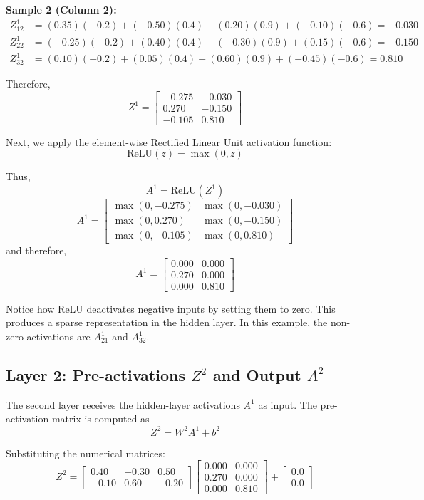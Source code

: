 \documentclass[11pt]{article}
\begin{document}
\textbf{Sample 2 (Column 2):}
\begin{align*}
Z^1_{12} &= (0.35)(-0.2) + (-0.50)(0.4) + (0.20)(0.9) + (-0.10)(-0.6) = -0.030 \\
Z^1_{22} &= (-0.25)(-0.2) + (0.40)(0.4) + (-0.30)(0.9) + (0.15)(-0.6) = -0.150 \\
Z^1_{32} &= (0.10)(-0.2) + (0.05)(0.4) + (0.60)(0.9) + (-0.45)(-0.6) = 0.810
\end{align*}

Therefore,
\[
Z^1 =
\begin{bmatrix}
-0.275 & -0.030 \\
0.270 & -0.150 \\
-0.105 & 0.810
\end{bmatrix}
\]

Next, we apply the element-wise Rectified Linear Unit activation function:
\[
\text{ReLU}(z) = \max(0, z)
\]

Thus,
\[
A^1 = \text{ReLU}(Z^1)
\]
\[
A^1 = \begin{bmatrix} \max(0, -0.275) & \max(0, -0.030) \\ \max(0, 0.270) & \max(0, -0.150) \\ \max(0, -0.105) & \max(0, 0.810) \end{bmatrix}
\]
and therefore,
\[
A^1 =
\begin{bmatrix}
0.000 & 0.000 \\
0.270 & 0.000 \\
0.000 & 0.810
\end{bmatrix}
\]

Notice how ReLU deactivates negative inputs by setting them to zero. This produces a sparse representation in the hidden layer. In this example, the non-zero activations are $A^1_{21}$ and $A^1_{32}$.

\subsection{Layer 2: Pre-activations \texorpdfstring{$Z^2$}{Z2} and Output \texorpdfstring{$A^2$}{A2}}

The second layer receives the hidden-layer activations $A^1$ as input. The pre-activation matrix is computed as
\[
Z^2 = W^2 A^1 + b^2
\]

Substituting the numerical matrices:
\[
Z^2 = \begin{bmatrix} 0.40 & -0.30 & 0.50 \\ -0.10 & 0.60 & -0.20 \end{bmatrix} \begin{bmatrix} 0.000 & 0.000 \\ 0.270 & 0.000 \\ 0.000 & 0.810 \end{bmatrix} + \begin{bmatrix} 0.0 \\ 0.0 \end{bmatrix}
\]
\end{document}
